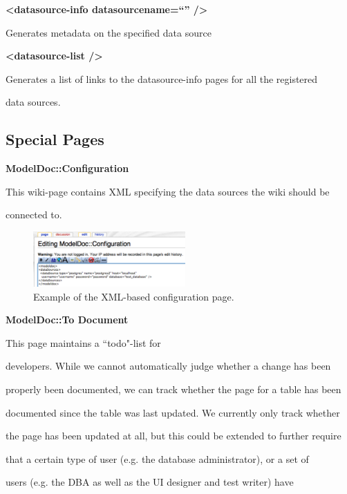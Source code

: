 \documentclass{acm_proc_article-sp}
\begin{document}
\textbf{<datasource-info datasourcename=``'' />}

Generates metadata on the specified data source



\textbf{<datasource-list />}

Generates a list of links to the datasource-info pages for all the registered

data sources.



\subsection{Special Pages}



\textbf{ModelDoc::Configuration}

This wiki-page contains XML specifying the data sources the wiki should be

connected to.



\begin{figure}[ht]

\centering

\includegraphics[width=220px]{configuration.pdf}

\caption{Example of the XML-based configuration page.}

\end{figure}



\textbf{ModelDoc::To Document}

This page maintains a ``todo"-list for

developers.  While we cannot automatically judge whether a change has been

properly been documented, we can track whether the page for a table has been

documented since the table was last updated.  We currently only track whether

the page has been updated at all, but this could be extended to further require

that a certain type of user (e.g. the database administrator), or a set of

users (e.g. the DBA as well as the UI designer and test writer) have
\end{document}
